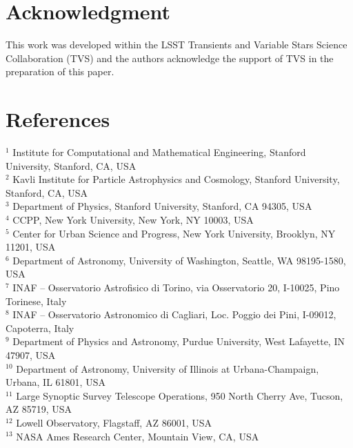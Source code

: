 \documentclass[12pt, letterpaper]{article}
\begin{document}
\section{Acknowledgment}
\label{sec:ack}
This work was developed within the LSST Transients and Variable Stars Science Collaboration (TVS) and the authors acknowledge the support of TVS in the preparation of this paper.

\section{References}

\begingroup
\renewcommand{\section}[2]{}%


\endgroup

\section*{Author Affiliations}
\parbox{\textwidth}{
\footnotesize
$^{1}$ Institute for Computational and Mathematical Engineering, Stanford University, Stanford, CA, USA\\
$^{2}$ Kavli Institute for Particle Astrophysics and Cosmology, Stanford University, Stanford, CA, USA\\
$^{3}$ Department of Physics, Stanford University, Stanford, CA 94305, USA\\
$^{4}$ CCPP, New York University, New York, NY 10003, USA\\
$^{5}$ Center for Urban Science and Progress, New York University, Brooklyn, NY 11201, USA\\
$^{6}$ Department of Astronomy, University of Washington, Seattle, WA 98195-1580, USA\\
$^{7}$ INAF – Osservatorio Astrofisico di Torino, via Osservatorio 20, I-10025, Pino Torinese, Italy\\
$^{8}$ INAF – Osservatorio Astronomico di Cagliari, Loc. Poggio dei Pini, I-09012, Capoterra, Italy\\
$^{9}$ Department of Physics and Astronomy, Purdue University, West Lafayette, IN 47907, USA\\
$^{10}$ Department of Astronomy, University of Illinois at Urbana-Champaign, Urbana, IL 61801, USA\\
$^{11}$ Large Synoptic Survey Telescope Operations, 950 North Cherry
Ave, Tucson, AZ 85719, USA\\
$^{12}$ Lowell Observatory, Flagstaff, AZ 86001, USA\\
$^{13}$ NASA Ames Research Center, Mountain View, CA, USA\\
}
\end{document}
